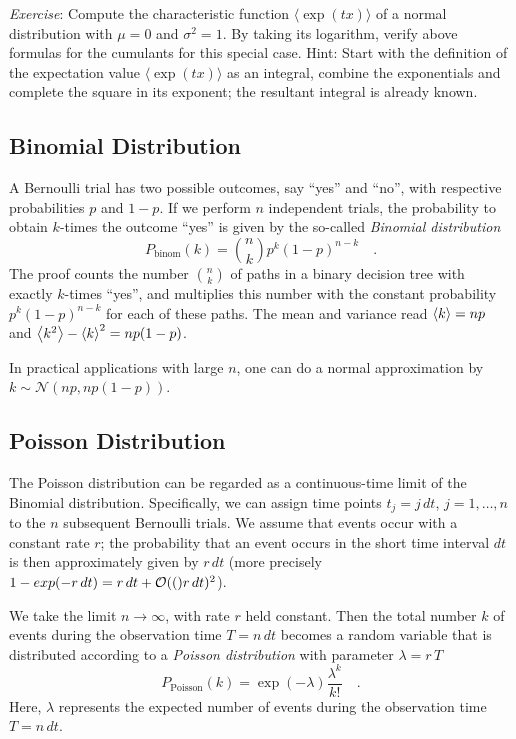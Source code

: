 \documentclass{notebook}
\newcommand{\Exercise}{\textit{Exercise}}
\begin{document}
\Exercise: Compute the characteristic function $\langle \exp(tx) \rangle$ of a normal distribution with $\mu=0$ and $\sigma^2=1$. By taking its logarithm, verify above formulas for the cumulants for this special case. Hint: Start with the definition of the expectation value $\langle \exp(tx) \rangle$ as an integral, combine the exponentials and complete the square in its exponent; the resultant integral is already known.


\subsection*{Binomial Distribution}

A Bernoulli trial has two possible outcomes, say ``yes'' and ``no'', with respective probabilities $p$ and $1 - p$. 
If we perform $n$ independent trials, the probability to obtain $k$-times the outcome ``yes'' is given by
the so-called \textit{Binomial distribution}
%
\begin{equation}
P_\mathrm{binom}(k) = \binom{n}{k} p^k (1 - p)^{n - k} \quad.
\end{equation}
%
The proof counts the number $\binom{n}{k}$ of paths in a binary decision tree with exactly $k$-times ``yes'', 
and multiplies this number with the constant probability $p^k(1-p)^{n-k}$ for each of these paths.
The mean and variance read $\expval{k} = n p$ and $\expval{k^2} - \expval{k}^2 = n p (1 - p)$. 

In practical applications with large $n$, one can do a normal approximation by $k \sim \mathcal{N}(np, n p (1 - p))$. 


\subsection*{Poisson Distribution}
The Poisson distribution can be regarded as a continuous-time limit of the Binomial distribution.
Specifically, 
we can assign time points $t_j = j \, dt$, $j=1,\ldots,n$ to the $n$ subsequent Bernoulli trials.
We assume that events occur with a constant rate $r$; 
the probability that an event occurs in the short time interval $dt$ 
is then approximately given by $r\,dt$
(more precisely $1-exp(-r\,dt)=r\,dt+\mathcal{O}(()r\,dt)^2$).

We take the limit $n\rightarrow\infty$, with rate $r$ held constant.
Then the total number $k$ of events during the observation time $T=n\,dt$ 
becomes a random variable that is distributed according to a
\textit{Poisson distribution} with parameter $\lambda = r\,T$
\begin{equation}
\label{eq:Ppoiss}
P_\mathrm{Poisson}(k) = \exp(-\lambda) \frac{\lambda^k}{k!} \quad.
\end{equation}
Here, $\lambda$ represents the expected number of events during the observation time $T=n\,dt$.
\end{document}

